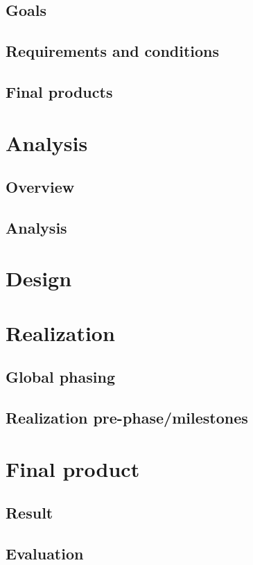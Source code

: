 \documentclass[12pt,a4paper]{report}
\begin{document}
\section{Goals}

\section{Requirements and conditions}

\section{Final products}

\chapter{Analysis}
\section{Overview}

\section{Analysis}

\chapter{Design}

\chapter{Realization}
\section{Global phasing}

\section{Realization pre-phase/milestones}

\chapter{Final product}
\section{Result}

\section{Evaluation}
\end{document}
